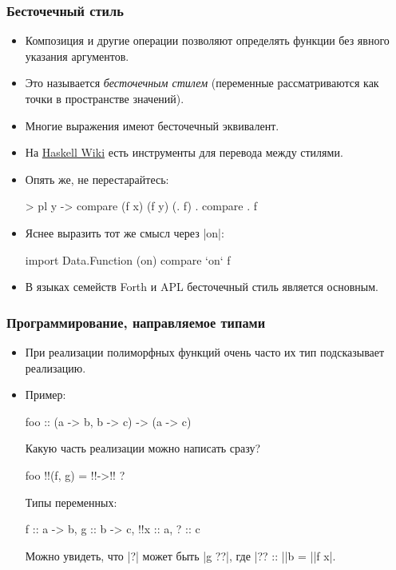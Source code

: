 \documentclass[10pt]{beamer}
\begin{document}
\begin{frame}[fragile]
  \frametitle{Бесточечный стиль}
  \begin{itemize}
    \item Композиция и другие операции позволяют определять функции без явного указания аргументов.
    \item Это называется \emph{бесточечным стилем} (переменные рассматриваются как точки в пространстве значений).\pause
    \item Многие выражения имеют бесточечный эквивалент.
    \item На \href{https://wiki.haskell.org/Pointfree}{Haskell Wiki} есть инструменты для перевода между стилями.
    \item Опять же, не перестарайтесь:
          \begin{haskell}
            > pl \x y -> compare (f x) (f y)
            (. f) . compare . f
          \end{haskell}
          \pause
    \item Яснее выразить тот же смысл через \haskinline|on|:
          \begin{haskell}
            import Data.Function (on)
            compare `on` f
          \end{haskell}
    \item В языках семейств Forth и APL бесточечный стиль является основным.
  \end{itemize}
\end{frame}

\begin{frame}[fragile]
  \frametitle{Программирование, направляемое типами}
  \begin{itemize}
    \item При реализации полиморфных функций очень часто их тип подсказывает реализацию.
    \item Пример:
          \begin{haskell}
            foo :: (a -> b, b -> c) -> (a -> c)
          \end{haskell}
          Какую часть реализации можно написать сразу?
          \begin{haskell}
            foo !\pause!(f, g) = !\pause!\x ->!\pause! ?
          \end{haskell}
          Типы переменных:\pause
          \begin{haskell}
            f :: a -> b, g :: b -> c, !\pause!x :: a, ? :: c
          \end{haskell}
          Можно увидеть, что \haskinline|?| может быть \haskinline|g ??|, где \haskinline|?? :: |\pause\haskinline|b = |\pause\haskinline|f x|.
  \end{itemize}
\end{frame}
\end{document}
